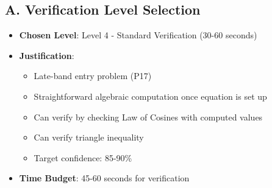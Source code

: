 \documentclass[12pt]{article}
\begin{document}
\begin{verificationbox}
\subsection*{A. Verification Level Selection}
\begin{itemize}[leftmargin=*]
    \item \textbf{Chosen Level}: Level 4 - Standard Verification (30-60 seconds)
    \item \textbf{Justification}: 
    \begin{itemize}
        \item Late-band entry problem (P17)
        \item Straightforward algebraic computation once equation is set up
        \item Can verify by checking Law of Cosines with computed values
        \item Can verify triangle inequality
        \item Target confidence: 85-90\%
    \end{itemize}
    \item \textbf{Time Budget}: 45-60 seconds for verification
\end{itemize}


\end{verificationbox}
\end{document}
